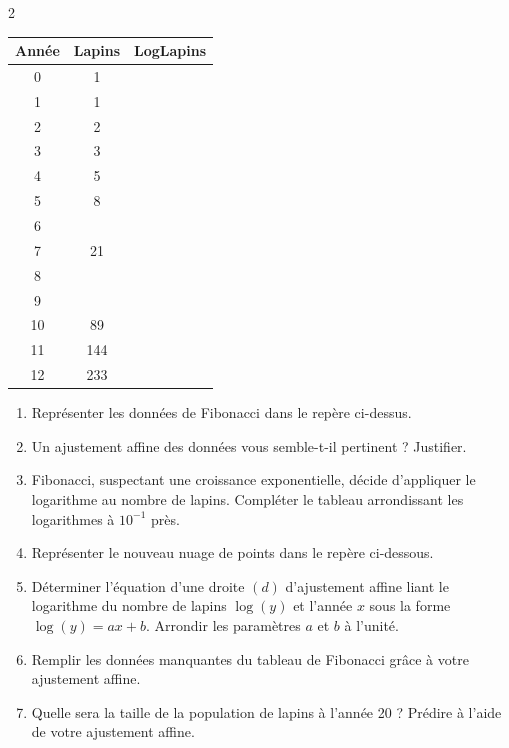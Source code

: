 {\begin{multicols}{2}
\def\arraystretch{1.25}
\setlength\tabcolsep{5pt}
	\hspace{50pt}
	\begin{tabular}{|c|c|c|}
		\hline
		\textbf{Année} & \textbf{Lapins} & \textbf{LogLapins}
		\\\hline
		0 & 1 & \\ \hline
		1 & 1 & \\ \hline
		2 & 2 & \\\hline
		3 & 3 & \\\hline
		4 & 5 & \\\hline
		5 & 8 & \\\hline
		6 &  & \\ \hline
		7 & 21 & \\\hline
		8 &  & \\\hline
		9 &  & \\\hline
		10 & 89 & \\\hline
		11 & 144 & \\\hline
		12 & 233 & \\\hline
	\end{tabular}
	\vfill\null
	\end{multicols}
	
	\begin{enumerate}
		\item
		Représenter les données de Fibonacci dans le repère ci-dessus.
		\item
		Un ajustement affine des données vous semble-t-il pertinent ? Justifier.
		\item
		Fibonacci, suspectant une croissance exponentielle, décide d'appliquer le logarithme au nombre de lapins.
		Compléter le tableau arrondissant les logarithmes à $10^{-1}$ près.
		\item
		Représenter le nouveau nuage de points dans le repère ci-dessous.
		\item 
		Déterminer l'équation d'une droite $(d)$ d'ajustement affine liant le logarithme du nombre de lapins $\log(y)$ et l'année $x$ sous la forme $\log(y)=ax+b$.
		Arrondir les paramètres $a$ et $b$ à l'unité.
		\item
		Remplir les données manquantes du tableau de Fibonacci grâce à votre ajustement affine.
		\item
		Quelle sera la taille de la population de lapins à l'année 20 ?
		Prédire à l'aide de votre ajustement affine.
	\end{enumerate}
	
}
